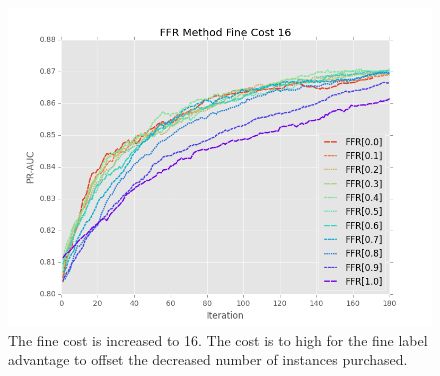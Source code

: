 \documentclass[ms]{nuthesis}
\begin{document}
\FloatBarrier
\begin{figure}[!htb]
	\centering
    \includegraphics[width=1.0\columnwidth]{fig/ParamsFFR_PR_Cost16_rnds0_180}
    \caption{The fine cost is increased to 16. The cost is to high for the fine label advantage to offset
    the decreased number of instances purchased.}
    \label{fig:ParamsFFR_PR_Cost16_rnds0_180}
\end{figure}
\FloatBarrier

%


%
%


%
\end{document}

